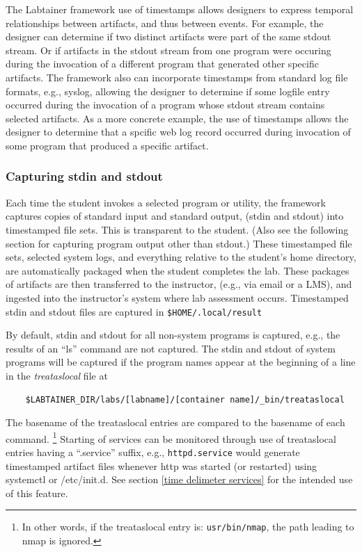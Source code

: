 \documentclass[12pt]{article}
\begin{document}
The Labtainer framework use of timestamps allows designers to express temporal 
relationships between artifacts, and thus between events.  For example, the designer can determine if
two distinct artifacts were part of the same stdout stream.  Or if artifacts in the stdout stream from one 
program were occuring during the invocation of a different program that generated other specific artifacts.  
The framework also can incorporate
timestamps from standard log file formats, e.g., syslog, allowing the designer to determine if some logfile
entry occurred during the invocation of a program whose stdout stream contains selected artifacts.
As a more concrete example, the use of timestamps allows the designer to determine that a spcific web log
record occurred during invocation of some program that produced a specific artifact.

\subsubsection{Capturing stdin and stdout}
\label{stdin and stdout}
Each time the student invokes a selected program or utility, the 
framework captures copies of standard input and standard output, (stdin and stdout) into timestamped file sets.
This is transparent to the student.  (Also see the following section for capturing
program output other than stdout.)  These timestamped file sets, selected system logs,  and everything relative to
the student's home directory, are automatically packaged when the student completes the lab.
These packages of artifacts are then transferred to the instructor, (e.g., via email or a LMS), and 
ingested into the instructor's system where lab assessment occurs. Timestamped stdin and stdout files
are captured in \texttt{\$HOME/.local/result}

By default, stdin and stdout for all non-system programs is captured, e.g., the results of an ``ls'' command
are not captured.  The stdin and stdout of system programs will be captured if the program
names appear at the beginning of a line in the \textit{treataslocal} file at
\begin{verbatim}
    $LABTAINER_DIR/labs/[labname]/[container name]/_bin/treataslocal
\end{verbatim}
\noindent The basename of the treataslocal entries are compared to the basename of each command.
\footnote{In other words, if the treataslocal entry is: \texttt{usr/bin/nmap}, the path leading to nmap is ignored.}
Starting of services can be monitored through use of treataslocal entries having a ``.service'' suffix,
e.g., {\tt httpd.service} would generate timestamped artifact files whenever http was started (or restarted)
using systemctl or /etc/init.d.  See section \ref{time delimeter services} for the intended use of this feature.
\end{document}
